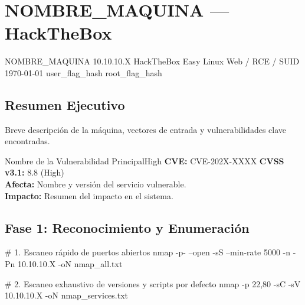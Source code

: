 \documentclass[../../../main_compilation.tex]{subfiles}
\begin{document}
\section[HTB - NOMBRE\_MAQUINA (10.10.10.X)]{NOMBRE\_MAQUINA — HackTheBox}
\label{sec:htb-nombre-maquina}

\targetSummary%
{NOMBRE\_MAQUINA}%
{10.10.10.X}%
{HackTheBox}%
{Easy}%
{Linux}%
{Web / RCE / SUID}%
{\today}%
{user\_flag\_hash}%
{root\_flag\_hash}%

\vspace{0.4cm}

\subsection{Resumen Ejecutivo}
Breve descripción de la máquina, vectores de entrada y vulnerabilidades clave encontradas.

\begin{vulnbox}{Nombre de la Vulnerabilidad Principal}{High}
	\textbf{CVE:} CVE-202X-XXXX \hfill \textbf{CVSS v3.1:} 8.8 (High)\\
	\textbf{Afecta:} Nombre y versión del servicio vulnerable.\\
	\textbf{Impacto:} Resumen del impacto en el sistema.
\end{vulnbox}

\subsection{Fase 1: Reconocimiento y Enumeración}

\begin{terminal}
	# 1. Escaneo rápido de puertos abiertos
	nmap -p- --open -sS --min-rate 5000 -n -Pn 10.10.10.X -oN nmap_all.txt

	# 2. Escaneo exhaustivo de versiones y scripts por defecto
	nmap -p 22,80 -sC -sV 10.10.10.X -oN nmap_services.txt
\end{terminal}
\end{document}

